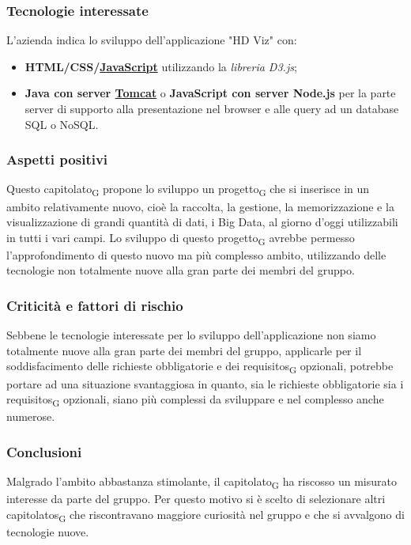 \subsubsection{Tecnologie interessate}
L'azienda indica lo sviluppo dell'applicazione "HD Viz" con:
\begin{itemize}
\item \textbf{HTML/CSS/\href{https://developer.mozilla.org/en-US/docs/Web/JavaScript/About_JavaScript}{JavaScript}} utilizzando la \textit{libreria D3.js};
\item \textbf{Java con server \href{http://tomcat.apache.org/}{Tomcat}} o \textbf{JavaScript con server Node.js} per la parte server di supporto alla presentazione nel browser e alle query ad un database SQL o NoSQL.
\end{itemize}
\subsubsection{Aspetti positivi}
Questo \gls{capitolato}\textsubscript{G} propone lo sviluppo un \gls{progetto}\textsubscript{G} che si inserisce in un ambito relativamente nuovo, cioè la raccolta, la gestione, la memorizzazione e la visualizzazione di grandi quantità di dati, i Big Data, al giorno d'oggi utilizzabili in tutti i vari campi.
Lo sviluppo di questo \gls{progetto}\textsubscript{G} avrebbe permesso l'approfondimento di questo nuovo ma più complesso ambito, utilizzando delle tecnologie non totalmente nuove alla gran parte dei membri del gruppo.
\subsubsection{Criticità e fattori di rischio}
Sebbene le tecnologie interessate per lo sviluppo dell'applicazione non siamo totalmente nuove alla gran parte dei membri del gruppo, applicarle per il soddisfacimento delle richieste obbligatorie e dei \glspl{requisito}\textsubscript{G} opzionali, potrebbe portare ad una situazione svantaggiosa in quanto, sia le richieste obbligatorie sia i \glspl{requisito}\textsubscript{G} opzionali, siano più complessi da sviluppare e nel complesso anche numerose.
\subsubsection{Conclusioni}
Malgrado l'ambito abbastanza stimolante, il \gls{capitolato}\textsubscript{G} ha riscosso un misurato interesse da parte del gruppo.
Per questo motivo si è scelto di selezionare altri \glspl{capitolato}\textsubscript{G} che riscontravano maggiore curiosità nel gruppo e che si avvalgono di tecnologie nuove.